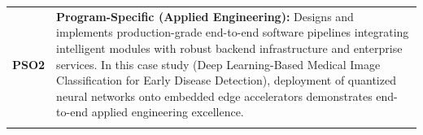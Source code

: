 {\begin{longtable}{@{}>{\centering\arraybackslash}p{1.8cm} p{13.2cm}@{}}
    \addlinespace
\textbf{PSO2} & \textbf{Program-Specific (Applied Engineering):} Designs and implements production-grade end-to-end software pipelines integrating intelligent modules with robust backend infrastructure and enterprise services. In this case study (Deep Learning-Based Medical Image Classification for Early Disease Detection), deployment of quantized neural networks onto embedded edge accelerators demonstrates end-to-end applied engineering excellence. \\
    \addlinespace
    \bottomrule
\end{longtable}}